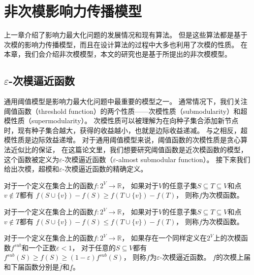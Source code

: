 
\chapter{非次模影响力传播模型}
上一章介绍了影响力最大化问题的发展情况和现有算法。
但是这些算法都是基于次模的影响力传播模型，而且在设计算法的过程中大多也利用了次模的性质。
在本章，我们会介绍非次模模型，本文的研究也是基于所提出的非次模模型。

\section{$\varepsilon$-次模逼近函数}
通用阈值模型是影响力最大化问题中最重要的模型之一。
通常情况下，我们关注阈值函数（threshold function）的两个性质——次模性质（submodularity）和超模性质（supermodularity）。
次模性质可以被理解为在向种子集合添加新节点时，现有种子集合越大，获得的收益越小，也就是边际收益递减。
与之相反，超模性质是边际效益递增。
对于通用阈值模型来说，阈值函数的次模性质是贪心算法近似比的保证\cite{Mossel2007sub}，
在这篇论文里，我们想要研究阈值函数是近次模函数的模型，这个函数被定义为$\varepsilon$-次模逼近函数（$\varepsilon$-almost submodular function）。
接下来我们给出次模，超模和$\varepsilon$-次模逼近函数的精确定义。

\begin{definition}[次模 (Submodular)]
对于一个定义在集合上的函数$f:2^V \to \mathbb{R}$，
如果对于$V$的任意子集$S \subseteq T \subseteq V$和点$v \not\in T$都有
$f(S \cup \{v\}) - f(S) \geq f(T \cup \{v\}) - f(T)$，
则称$f$为次模函数。
\end{definition}

\begin{definition}[超模 (Supermodular)]
对于一个定义在集合上的函数$f:2^V \to \mathbb{R}$，
如果对于$V$的任意子集$S \subseteq T \subseteq V$和点$v \not\in T$都有
$f(S \cup \{v\}) - f(S) \leq f(T \cup \{v\}) - f(T)$，
则称$f$为次模函数。
\end{definition}

\begin{definition}
\label{def:eas}
对于一个定义在集合上的函数$f:2^V \to \mathbb{R}$，
如果存在一个同样定义在$2^V$上的次模函数$f^{sub}$和一个正数$\varepsilon<1$，
对于任意的$S \subseteq V$都有$f^{sub}(S) \geq f(S) \geq (1-\varepsilon)f^{sub}(S)$，
则称$f$为$\varepsilon$-次模逼近函数。
$f$的次模上届和下届函数分别是$\overline{f}$和$\underline{f}$。
\end{definition}

